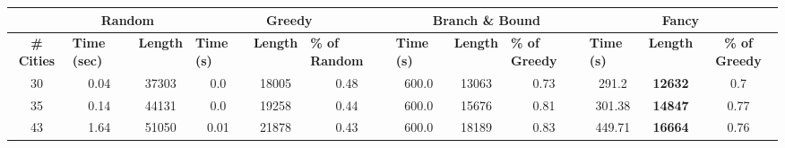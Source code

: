

\begin{table*}[]
    \centering
    \begin{tabular}{|c|cc|ccc|ccc|ccc|}
    \hline
                         & \multicolumn{2}{c|}{\textbf{Random}}                                                 & \multicolumn{3}{c|}{\textbf{Greedy}}                                                                                            & \multicolumn{3}{c|}{\textbf{Branch \& Bound}}                                                                                   & \multicolumn{3}{c|}{\textbf{Fancy}}                                                                        \\ \hline
    \textbf{\#   Cities} & \multicolumn{1}{l|}{\textbf{Time (sec)}} & \multicolumn{1}{l|}{\textbf{Length}} & \multicolumn{1}{l|}{\textbf{Time (s)}} & \multicolumn{1}{l|}{\textbf{Length}} & \multicolumn{1}{l|}{\textbf{\% of Random}} & \multicolumn{1}{l|}{\textbf{Time (s)}} & \multicolumn{1}{l|}{\textbf{Length}} & \multicolumn{1}{l|}{\textbf{\% of Greedy}} & \multicolumn{1}{l|}{\textbf{Time (s)}} & \multicolumn{1}{l|}{\textbf{Length}} & \textbf{\% of Greedy} \\ \hline
    30                   & 0.04                                     & 37303                                     & 0.0                                    & 18005                                     & 0.48                                       & 600.0                                  & 13063                                     & 0.73                                       & 291.2                                  & \textbf{12632}                            & 0.7                   \\
    35                   & 0.14                                     & 44131                                     & 0.0                                    & 19258                                     & 0.44                                       & 600.0                                  & 15676                                     & 0.81                                       & 301.38                                 & \textbf{14847}                            & 0.77                  \\
    43                   & 1.64                                     & 51050                                     & 0.01                                   & 21878                                     & 0.43                                       & 600.0                                  & 18189                                     & 0.83                                       & 449.71                                 & \textbf{16664}                            & 0.76                  \\

\end{tabular}
\end{table*}
